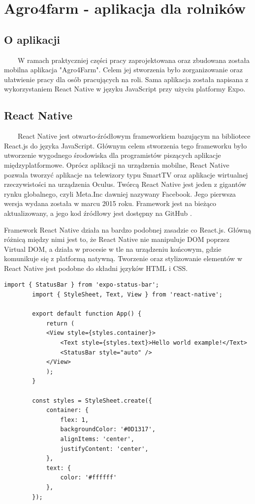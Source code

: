 \documentclass[a4paper,12pt,oneside]{book}
\begin{document}
	\newpage
	\chapter{Agro4farm - aplikacja dla rolników}
	
	\section{O aplikacji}
	\ \ \ \
	W ramach praktyczniej części pracy zaprojektowana oraz zbudowana została mobilna aplikacja "Agro4Farm". Celem jej stworzenia było zorganizowanie oraz ułatwienie pracy dla osób pracujących na roli. Sama aplikacja została napisana z wykorzystaniem React Native w języku JavaScript przy użyciu platformy Expo.
	
	\section{React Native}
	\ \ \ \
	React Native jest otwarto-źródłowym frameworkiem bazującym na bibliotece React.js do języka JavaScript. Głównym celem stworzenia tego frameworku było utworzenie wygodnego środowiska dla programistów piszących aplikacje międzyplatformowe. Oprócz aplikacji na urządzenia mobilne, React Native pozwala tworzyć aplikacje na telewizory typu SmartTV oraz aplikacje wirtualnej rzeczywistości na urządzenia Oculus. Twórcą React Native jest jeden z gigantów rynku globalnego, czyli Meta.Inc dawniej nazywany Facebook. Jego pierwsza wersja wydana została w marcu 2015 roku. Framework jest na bieżąco aktualizowany, a jego kod źródłowy jest dostępny na GitHub \cite{ref9}.
	
	\newpage
	
	Framework React Native działa na bardzo podobnej zasadzie co React.js. Główną różnicą między nimi jest to, że React Native nie manipuluje DOM poprzez Virtual DOM, a działa w procesie w tle na urządzeniu końcowym, gdzie komunikuje się z platformą natywną. Tworzenie oraz stylizowanie elementów w React Native jest podobne do składni języków HTML i CSS.
	
	\begin{lstlisting}[caption=Kod przykładowej aplikacji "Hello world" w React Native]
		import { StatusBar } from 'expo-status-bar';
		import { StyleSheet, Text, View } from 'react-native';
		
		export default function App() {
			return (
			<View style={styles.container}>
				<Text style={styles.text}>Hello world example!</Text>
				<StatusBar style="auto" />
			</View>
			);
		}
		
		const styles = StyleSheet.create({
			container: {
				flex: 1,
				backgroundColor: '#0D1317',
				alignItems: 'center',
				justifyContent: 'center',
			},
			text: {
				color: '#ffffff'
			},
		});
	\end{lstlisting}
\end{document}
